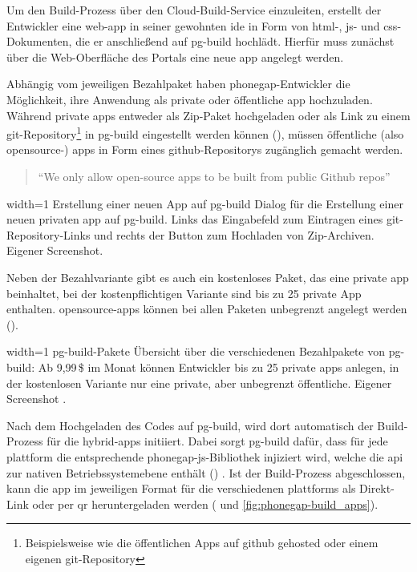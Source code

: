 {Um den Build-Prozess über den Cloud-Build-Service einzuleiten, erstellt der Entwickler eine \gls{web-app} in seiner gewohnten \gls{ide} in Form von \gls{html}-, \gls{js}- und \gls{css}-Dokumenten, die er anschließend auf \gls{pg-build} hochlädt.
Hierfür muss zunächst über die Web-Oberfläche des Portals eine neue \gls{app} angelegt werden.

Abhängig vom jeweiligen Bezahlpaket haben \gls{phonegap}-Entwickler die Möglichkeit, ihre Anwendung als private oder öffentliche \gls{app} hochzuladen. 
Während private \glspl{app} entweder als Zip-Paket hochgeladen oder als Link zu einem \gls{git}-Repository\footnote{Beispielsweise wie die öffentlichen Apps auf \gls{github} gehosted oder einem eigenen \gls{git}-Repository} in \gls{pg-build} eingestellt werden können (), müssen öffentliche (also \gls{opensource}-) \glspl{app} in Form eines \gls{github}-Repositorys zugänglich gemacht werden.

\begin{quote}
\enquote{We only allow open-source apps to be built from public Github repos} \cite{PhoneGap_Build_Apps}
\end{quote}




	{width=1\textwidth}
	{Erstellung einer neuen App auf \gls{pg-build}}
		{Dialog für die Erstellung einer neuen privaten \gls{app} auf \gls{pg-build}. Links das Eingabefeld zum Eintragen eines \gls{git}-Repository-Links und rechts der Button zum Hochladen von Zip-Archiven.}
	{Eigener Screenshot.}

Neben der Bezahlvariante gibt es auch ein kostenloses Paket, das eine private \gls{app} beinhaltet, bei der kostenpflichtigen Variante sind bis zu 25 private App enthalten.
\gls{opensource}-\glspl{app} können bei allen Paketen unbegrenzt angelegt werden ().

	{width=1\textwidth}
	{\gls{pg-build}-Pakete}
		{Übersicht über die verschiedenen Bezahlpakete von \gls{pg-build}: Ab 9,99\,\$ im Monat können Entwickler bis zu 25 private \glspl{app} anlegen, in der kostenlosen Variante nur eine private, aber unbegrenzt öffentliche.}
	{Eigener Screenshot \cite{Adobe_PhoneGap_Build_Plans}.}

Nach dem Hochgeladen des Codes auf \gls{pg-build}, wird dort automatisch der Build-Prozess für die \glspl{hybrid-app} initiiert.
Dabei sorgt \gls{pg-build} dafür, dass für jede \gls{plattform} die entsprechende \gls{phonegap}-\gls{js}-Bibliothek injiziert wird, welche die \gls{api} zur nativen Betriebssystemebene enthält () \cite{PhoneGap_Build_Documentation_getting-started}.
Ist der Build-Prozess abgeschlossen, kann die \gls{app} im jeweiligen Format für die verschiedenen \glspl{plattform} als Direkt-Link oder per \gls{qr} heruntergeladen werden ( und \ref{fig:phonegap-build_apps}).

}
